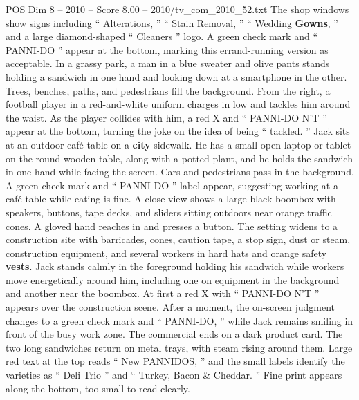 \begin{textsample}{POS Dim 8 – 2010 – Score 8.00 – 2010/tv\_com\_2010\_52.txt}
The shop windows show signs including “ Alterations, ” “ Stain Removal, ” “ Wedding \textbf{Gowns}, ” and a large diamond-shaped “ Cleaners ” logo.
A green check mark and “ PANNI-DO ” appear at the bottom, marking this errand-running version as acceptable.
In a grassy park, a man in a blue sweater and olive pants stands holding a sandwich in one hand and looking down at a smartphone in the other.
Trees, benches, paths, and pedestrians fill the background.
From the right, a football player in a red-and-white uniform charges in low and tackles him around the waist.
As the player collides with him, a red X and “ PANNI-DO N’T ” appear at the bottom, turning the joke on the idea of being “ tackled. ” Jack sits at an outdoor café table on a \textbf{city} sidewalk.
He has a small open laptop or tablet on the round wooden table, along with a potted plant, and he holds the sandwich in one hand while facing the screen.
Cars and pedestrians pass in the background.
A green check mark and “ PANNI-DO ” label appear, suggesting working at a café table while eating is fine.
A close view shows a large black boombox with speakers, buttons, tape decks, and sliders sitting outdoors near orange traffic cones.
A gloved hand reaches in and presses a button.
The setting widens to a construction site with barricades, cones, caution tape, a stop sign, dust or steam, construction equipment, and several workers in hard hats and orange safety \textbf{vests}.
Jack stands calmly in the foreground holding his sandwich while workers move energetically around him, including one on equipment in the background and another near the boombox.
At first a red X with “ PANNI-DO N’T ” appears over the construction scene.
After a moment, the on-screen judgment changes to a green check mark and “ PANNI-DO, ” while Jack remains smiling in front of the busy work zone.
The commercial ends on a dark product card.
The two long sandwiches return on metal trays, with steam rising around them.
Large red text at the top reads “ New PANNIDOS, ” and the small labels identify the varieties as “ Deli Trio ” and “ Turkey, Bacon \& Cheddar. ” Fine print appears along the bottom, too small to read clearly.

\end{textsample}
